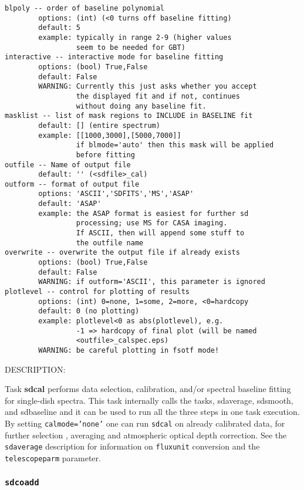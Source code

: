 \begin{verbatim}
blpoly -- order of baseline polynomial
        options: (int) (<0 turns off baseline fitting)
        default: 5
        example: typically in range 2-9 (higher values
                 seem to be needed for GBT)
interactive -- interactive mode for baseline fitting
        options: (bool) True,False
        default: False
        WARNING: Currently this just asks whether you accept
                 the displayed fit and if not, continues
                 without doing any baseline fit.
masklist -- list of mask regions to INCLUDE in BASELINE fit
        default: [] (entire spectrum)
        example: [[1000,3000],[5000,7000]]
                 if blmode='auto' then this mask will be applied
                 before fitting
outfile -- Name of output file
        default: '' (<sdfile>_cal)
outform -- format of output file
        options: 'ASCII','SDFITS','MS','ASAP'
        default: 'ASAP'
        example: the ASAP format is easiest for further sd
                 processing; use MS for CASA imaging.
                 If ASCII, then will append some stuff to
                 the outfile name
overwrite -- overwrite the output file if already exists
        options: (bool) True,False
        default: False
        WARNING: if outform='ASCII', this parameter is ignored
plotlevel -- control for plotting of results
        options: (int) 0=none, 1=some, 2=more, <0=hardcopy
        default: 0 (no plotting)
        example: plotlevel<0 as abs(plotlevel), e.g.
                 -1 => hardcopy of final plot (will be named
                 <outfile>_calspec.eps)
        WARNING: be careful plotting in fsotf mode!
\end{verbatim}
    
          DESCRIPTION:

          Task {\bf sdcal} performs data selection, calibration, and/or spectral
          baseline fitting for single-dish spectra. This task internally calls the
          tasks, sdaverage, sdsmooth, and sdbaseline and it can be used to run all the
          three steps in one task execution.
          By setting {\tt calmode='none'}
          one can run {\tt sdcal} on already calibrated data, for further selection
          , averaging and atmospheric optical depth correction.
          See the {\tt sdaverage} description for information on {\tt fluxunit} 
          conversion and the {\tt telescopeparm} parameter.
        

\subsubsection{{\tt sdcoadd}}
\label{section:sd.sdtasks.tasks.sdcoadd}

